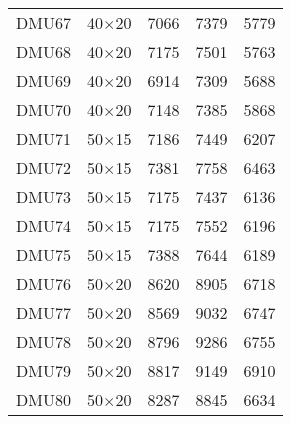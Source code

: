 \begin{table}[H]
\begin{tabular}{@{}ccccc@{}}
DMU67 & 40$\times$20 & 7066 & 7379 & 5779\\ 
DMU68 & 40$\times$20 & 7175 & 7501 & 5763\\ 
DMU69 & 40$\times$20 & 6914 & 7309 & 5688\\ 
DMU70 & 40$\times$20 & 7148 & 7385 & 5868\\ 
DMU71 & 50$\times$15 & 7186 & 7449 & 6207\\ 
DMU72 & 50$\times$15 & 7381 & 7758 & 6463\\ 
DMU73 & 50$\times$15 & 7175 & 7437 & 6136\\ 
DMU74 & 50$\times$15 & 7175 & 7552 & 6196\\ 
DMU75 & 50$\times$15 & 7388 & 7644 & 6189\\ 
DMU76 & 50$\times$20 & 8620 & 8905 & 6718\\ 
DMU77 & 50$\times$20 & 8569 & 9032 & 6747\\ 
DMU78 & 50$\times$20 & 8796 & 9286 & 6755\\ 
DMU79 & 50$\times$20 & 8817 & 9149 & 6910\\ 
DMU80 & 50$\times$20 & 8287 & 8845 & 6634\\ \bottomrule
\end{tabular}
\end{table}
